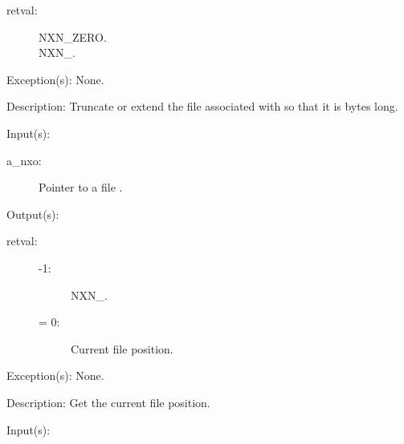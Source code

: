 \begin{capi}
\begin{capilist}
		\begin{description}\item[]
		\item[retval: ]
			\begin{description}\item[]
			\item[NXN\_ZERO.]
			\item[NXN\_.]
			\end{description}
		\end{description}
	\item[Exception(s): ] None.
	\item[Description: ]
		Truncate or extend the file associated with  so
		that it is  bytes long.
	\end{capilist}
\label{nxo_file_position_get}
	\begin{capilist}
	\item[Input(s): ]
		\begin{description}\item[]
		\item[a\_nxo: ]
			Pointer to a file .
		\end{description}
	\item[Output(s): ]
		\begin{description}\item[]
		\item[retval: ]
			\begin{description}\item[]
			\item[-1: ]
				NXN\_.
			\item[{\gt}= 0: ]
				Current file position.
			\end{description}\item[]
		\end{description}
	\item[Exception(s): ] None.
	\item[Description: ]
		Get the current file position.
	\end{capilist}
\label{nxo_file_position_set}
	\begin{capilist}
	\item[Input(s): ]

\end{capilist}
\end{capi}
